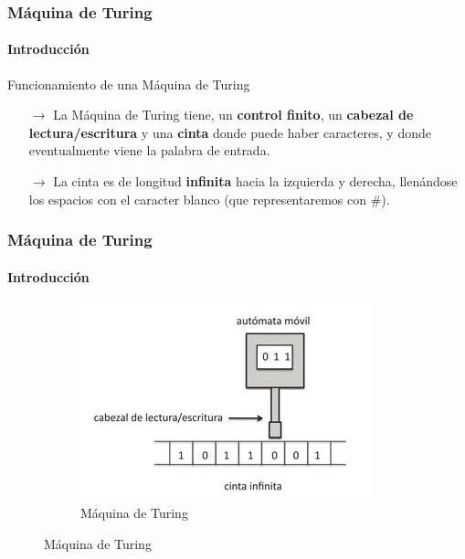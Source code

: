\documentclass{beamer}
\begin{document}
        \begin{frame}
            \frametitle{M\'aquina de Turing}
            \framesubtitle{Introducci\'on}

            \begin{block}{Funcionamiento de una M\'aquina de Turing}
                \begin{itemize}
                    \item[$\rightarrow$] La M\'aquina de Turing tiene, un \textbf{control finito}, un \textbf{cabezal de lectura/escritura} y una \textbf{cinta} donde puede haber caracteres, y donde eventualmente viene la palabra de entrada.
                    \item[$\rightarrow$] La cinta es de longitud \textbf{infinita} hacia la izquierda y derecha, llen\'andose los espacios con el caracter blanco (que representaremos con \#).
                \end{itemize}
			\end{block}
		\end{frame}

        \begin{frame}
            \frametitle{M\'aquina de Turing}
            \framesubtitle{Introducci\'on}

            \begin{figure}[H]
                \begin{figure}
                    \begin{center}
                        \includegraphics[scale=12]{images/mt.png}
                        \caption{M\'aquina de Turing}
                    \end{center}
                \end{figure}
            \end{figure}
		\end{frame}
\end{document}

